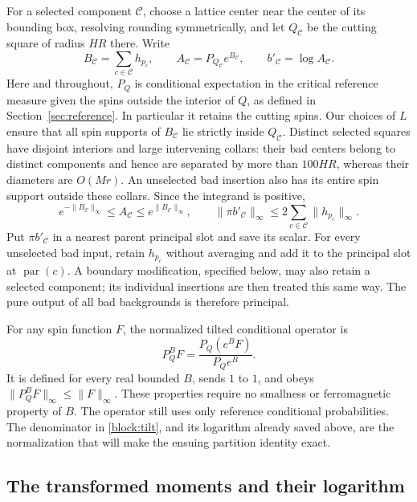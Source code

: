 For a selected component $\mathcal C$, choose a lattice center near the
center of its bounding box, resolving rounding symmetrically, and let
$Q_{\mathcal C}$ be the cutting square of radius $HR$ there.  Write
\[
 B_{\mathcal C}=\sum_{c\in\mathcal C}h_{p_c},\qquad
 A_{\mathcal C}=P_{Q_{\mathcal C}}e^{B_{\mathcal C}},\qquad
 b'_{\mathcal C}=\log A_{\mathcal C}.
\]
Here and throughout, $P_Q$ is conditional expectation in the critical
reference measure given the spins outside the interior of $Q$, as
defined in Section~\ref{sec:reference}.  In particular it retains the
cutting spins.  Our choices of $L$ ensure that all spin supports of
$B_{\mathcal C}$ lie strictly inside $Q_{\mathcal C}$.  Distinct selected
squares have disjoint interiors and large intervening collars: their
bad centers belong to distinct components and hence are separated by
more than $100HR$, whereas their diameters are $O(Mr)$.
An unselected bad insertion also has its entire spin support outside
these collars.  Since the integrand is positive,
\begin{equation}
 e^{-\|B_{\mathcal C}\|_\infty}
 \le A_{\mathcal C}\le e^{\|B_{\mathcal C}\|_\infty},
 \qquad
 \|\pi b'_{\mathcal C}\|_\infty
       \le2\sum_{c\in\mathcal C}\|h_{p_c}\|_\infty.
 \label{block:positive-log}
\end{equation}
Put $\pi b'_{\mathcal C}$ in a nearest parent principal slot and save
its scalar.  For every unselected bad input, retain $h_{p_c}$ without
averaging and add it to the principal slot at $\operatorname{par}(c)$.
A boundary modification, specified below, may also retain a selected
component; its individual insertions are then treated this same way.
The pure output of all bad backgrounds is therefore principal.

For any spin function $F$, the normalized tilted conditional operator is
\begin{equation}
 P_Q^B F=\frac{P_Q(e^BF)}{P_Qe^B}.
 \label{block:tilt}
\end{equation}
It is defined for every real bounded $B$, sends $1$ to $1$, and obeys
$\|P_Q^B F\|_\infty\le\|F\|_\infty$.  These properties require no
smallness or ferromagnetic property of $B$.  The operator still uses
only reference conditional probabilities.  The denominator in
\eqref{block:tilt}, and its logarithm already saved above, are the
normalization that will make the ensuing partition identity exact.

\subsection{The transformed moments and their logarithm}

